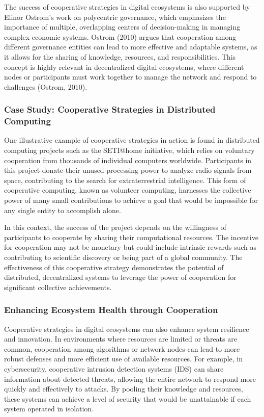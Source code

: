 \documentclass[12pt,twoside]{article}
\begin{document}
The success of cooperative strategies in digital ecosystems is also supported by Elinor Ostrom’s work on polycentric governance, which emphasizes the importance of multiple, overlapping centers of decision-making in managing complex economic systems. Ostrom (2010) argues that cooperation among different governance entities can lead to more effective and adaptable systems, as it allows for the sharing of knowledge, resources, and responsibilities. This concept is highly relevant in decentralized digital ecosystems, where different nodes or participants must work together to manage the network and respond to challenges (Ostrom, 2010).

\subsubsection{Case Study: Cooperative Strategies in Distributed Computing}

One illustrative example of cooperative strategies in action is found in distributed computing projects such as the SETI@home initiative, which relies on voluntary cooperation from thousands of individual computers worldwide. Participants in this project donate their unused processing power to analyze radio signals from space, contributing to the search for extraterrestrial intelligence. This form of cooperative computing, known as volunteer computing, harnesses the collective power of many small contributions to achieve a goal that would be impossible for any single entity to accomplish alone.

In this context, the success of the project depends on the willingness of participants to cooperate by sharing their computational resources. The incentive for cooperation may not be monetary but could include intrinsic rewards such as contributing to scientific discovery or being part of a global community. The effectiveness of this cooperative strategy demonstrates the potential of distributed, decentralized systems to leverage the power of cooperation for significant collective achievements.

\subsubsection{Enhancing Ecosystem Health through Cooperation}

Cooperative strategies in digital ecosystems can also enhance system resilience and innovation. In environments where resources are limited or threats are common, cooperation among algorithms or network nodes can lead to more robust defenses and more efficient use of available resources. For example, in cybersecurity, cooperative intrusion detection systems (IDS) can share information about detected threats, allowing the entire network to respond more quickly and effectively to attacks. By pooling their knowledge and resources, these systems can achieve a level of security that would be unattainable if each system operated in isolation.
\end{document}
